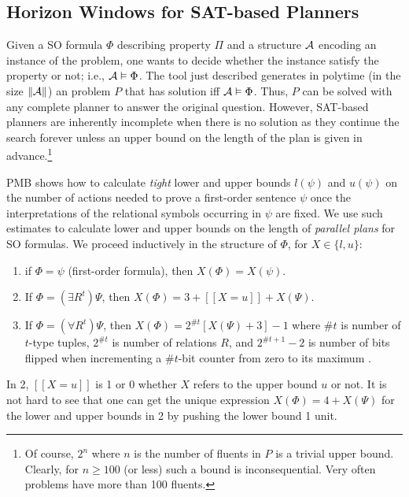 \subsection{Horizon Windows for SAT-based Planners}

Given a SO formula $\Phi$ describing property $\Pi$ and a
structure $\mathcal{A}$ encoding an instance of the problem, one
wants to decide whether the instance satisfy the property
or not; i.e., $\mathcal{A}\vDash\Phi$. The tool just described 
generates in polytime (in the size $\|\mathcal{A}\|$) an \STRIPS
problem $P$ that has solution iff $\mathcal{A}\vDash\Phi$.
Thus, $P$ can be solved with any complete planner to
answer the original question. However, SAT-based planners
are inherently incomplete when there is no solution as
they continue the search forever unless an upper bound
on the length of the plan is given in advance.\footnote{Of
course, $2^n$ where $n$ is the number of fluents in $P$
is a trivial upper bound. Clearly, for $n\geq100$ (or less)
such a bound is inconsequential. Very often problems have
more than 100 fluents.}

PMB shows how to calculate \emph{tight} lower and upper bounds
$l(\psi)$ and $u(\psi)$ on the number of actions needed to prove
a first-order sentence $\psi$ once the interpretations of the
relational symbols occurring in $\psi$ are fixed.
We use such estimates to calculate lower and upper bounds on
the length of \emph{parallel plans} for SO formulas.
We proceed inductively
in the structure of $\Phi$, for $X\in\{l,u\}$:
\begin{enumerate}[1.]
\item if $\Phi=\psi$ (first-order formula), then $X(\Phi)=X(\psi)$.
\item If $\Phi=(\exists R^t)\Psi$, then $X(\Phi)=3+[\![X=u]\!]+X(\Psi)$.
\item If $\Phi=(\forall R^t)\Psi$, then
  $X(\Phi)=2^{\#t}[X(\Psi)+3]-1$%
where
  $\#t$ is number of $t$-type tuples, $2^{\#t}$
  is number of relations $R$, and $2^{\#t+1}-2$ is number
  of bits flipped when incrementing a $\#t$-bit counter
  from zero to its maximum \cite{cormen:algorithms}.
\end{enumerate}
In 2, $[\![X=u]\!]$ is 1 or 0 whether $X$ refers to the 
upper bound $u$ or not. It is not hard to see that one
can get the unique expression $X(\Phi)=4+X(\Psi)$ for the
lower and upper bounds in 2 by pushing the lower bound 1 unit.

